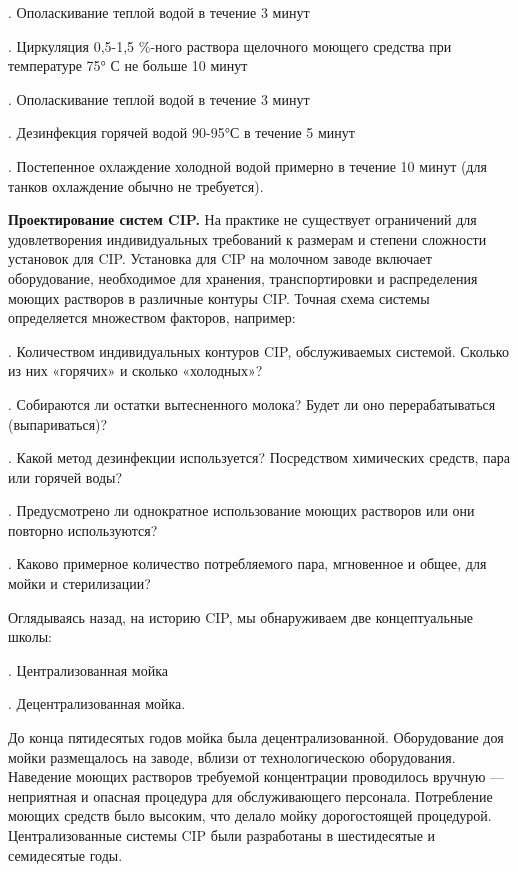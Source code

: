 {\par {}. Ополаскивание теплой водой в течение 3 минут
\par {}. Циркуляция 0,5-1,5 \%-ного раствора щелочного моющего средства при температуре 75° С не больше 10 минут
\par {}. Ополаскивание теплой водой в течение 3 минут
\par {}. Дезинфекция горячей водой 90-95°С в течение 5 минут
\par {}. Постепенное охлаждение холодной водой примерно в течение 10 минут (для танков охлаждение обычно не требуется).

\par \redline \textbf{Проектирование систем CIP.} На практике не существует ограничений для удовлетворения индивидуальных требований к размерам и степени сложности установок для CIP. Установка для CIP на молочном заводе включает оборудование, необходимое для хранения, транспортировки и распределения моющих растворов в различные контуры CIP. Точная схема системы определяется множеством факторов, например:

\par {}. Количеством индивидуальных контуров CIP, обслуживаемых системой. Сколько из них «горячих» и сколько «холодных»?
\par {}. Собираются ли остатки вытесненного молока? Будет ли оно перерабатываться (выпариваться)?
\par {}. Какой метод дезинфекции используется? Посредством химических средств, пара или горячей воды?
\par {}. Предусмотрено ли однократное использование моющих растворов или они повторно используются?
\par {}.  Каково примерное количество потребляемого пара, мгновенное и общее, для мойки и стерилизации?

\par \redline Оглядываясь назад, на историю CIP, мы обнаруживаем две концептуальные школы:

\par {}. Централизованная мойка
\par {}. Децентрализованная мойка.

\par \redline До конца пятидесятых годов мойка была децентрализованной. Оборудование доя мойки размещалось на заводе, вблизи от технологическою оборудования. Наведение моющих растворов требуемой концентрации проводилось вручную — неприятная и опасная процедура для обслуживающего персонала. Потребление моющих средств было высоким, что делало мойку дорогостоящей процедурой.
Централизованные системы CIP были разработаны в шестидесятые и семидесятые годы.

}

